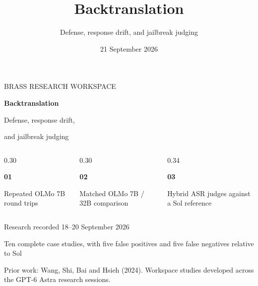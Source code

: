 \documentclass[aspectratio=169,10pt]{beamer}
\title{Backtranslation}
\subtitle{Defense, response drift, and jailbreak judging}
\date{21 September 2026}
\renewcommand{\normalsize}{\fontsize{20}{26}\selectfont}
\renewcommand{\small}{\fontsize{17}{22}\selectfont}
\newcommand{\sources}[1]{{\fontsize{10.5}{13}\selectfont\color{Muted}#1\par}}
\newcommand{\metric}[2]{{\fontsize{33}{38}\selectfont\bfseries\color{Output}#1\par}{\small #2\par}}
\begin{document}
\normalsize
\begin{frame}[plain]
 \par\vspace{1.1cm}
 {\color{Output}\fontsize{18}{23}\selectfont BRASS RESEARCH WORKSPACE\par}
 \par\vspace{0.55cm}
 {\fontsize{49}{57}\selectfont\bfseries Backtranslation\par}
 \par\vspace{0.35cm}
 {\fontsize{29}{37}\selectfont Defense, response drift,\par and jailbreak judging\par}
 \par\vspace{1.2cm}
 \begin{columns}[T,onlytextwidth]
  \begin{column}{0.30\textwidth}\metric{01}{Repeated OLMo 7B round trips}\end{column}
  \begin{column}{0.30\textwidth}\metric{02}{Matched OLMo 7B / 32B comparison}\end{column}
  \begin{column}{0.34\textwidth}\metric{03}{Hybrid ASR judges against a Sol reference}\end{column}
 \end{columns}
 \vfill
 {\small Research recorded 18--20 September 2026\par}
 {\small Ten complete case studies, with five false positives and five false negatives relative to Sol\par}
 \par\vspace{0.55cm}
 \sources{Prior work: Wang, Shi, Bai and Hsieh (2024). Workspace studies developed across the GPT-6 Astra research sessions.}
\end{frame}
\end{document}
